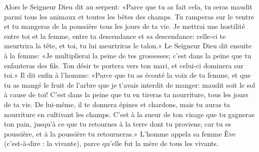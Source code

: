 Alors le Seigneur Dieu dit au serpent:
	«Parce que tu as fait cela, tu seras maudit
	parmi tous les animaux et toutes les bêtes des champs.
	Tu ramperas sur le ventre et tu mangeras de la poussière
	tous les jours de ta vie.
Je mettrai une hostilité entre toi et la femme,
	entre ta descendance et sa descendance:
	celle-ci te meurtrira la tête, et toi, tu lui meurtriras le talon.»
Le Seigneur Dieu dit ensuite à la femme:
	«Je multiplierai la peine de tes grossesses;
	c’est dans la peine que tu enfanteras des fils.
	Ton désir te portera vers ton mari, et celui-ci dominera sur toi.»
Il dit enfin à l’homme: «Parce que tu as écouté la voix de ta femme,
	et que tu as mangé le fruit de l’arbre que je t’avais interdit de manger:
	maudit soit le sol à cause de toi!
	C’est dans la peine que tu en tireras ta nourriture, tous les jours de ta vie.
De lui-même, il te donnera épines et chardons,
	mais tu auras ta nourriture en cultivant les champs.
C’est à la sueur de ton visage que tu gagneras ton pain,
	jusqu’à ce que tu retournes à la terre dont tu proviens;
	car tu es poussière, et à la poussière tu retourneras.»
L’homme appela sa femme Ève (c’est-à-dire : la vivante),
	parce qu’elle fut la mère de tous les vivants.
